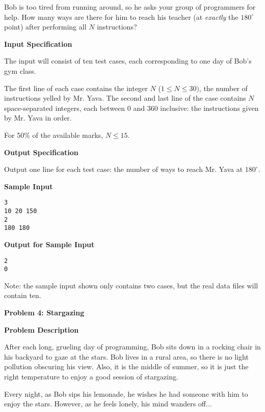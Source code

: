 \documentclass[11pt]{article}
\newcommand{\problem}[2]{\textbf{\Large Problem #1: #2} \vspace{0.4em}}
\newcommand{\heading}[1]{\vspace{0.6em} \textbf{#1}}
\begin{document}
Bob is too tired from running around, so he asks your group of programmers for help. How many ways are there for him to reach his teacher (at \textit{exactly} the $180^{\circ}$ point) after performing all $N$ instructions?


\heading{Input Specification}

The input will consist of ten test cases, each corresponding to one day of Bob's gym class.

The first line of each case contains the integer $N$ ($1 \le N \le 30)$, the number of instructions yelled by Mr. Yava. The second and last line of the case contains $N$ space-separated integers, each between 0 and 360 inclusive: the instructions given by Mr. Yava in order.

For 50\% of the available marks, $N \le 15$.


\heading{Output Specification}

Output one line for each test case: the number of ways to reach Mr. Yava at $180^{\circ}$.


\heading{Sample Input}
\vspace{-\topsep}
\begin{verbatim}
3
10 20 150
2
180 180
\end{verbatim}

\vspace{-\topsep}
\heading{Output for Sample Input}
\vspace{-\topsep}
\begin{verbatim}
2
0
\end{verbatim}

Note: the sample input shown only contains two cases, but the real data files will contain ten.


\pagebreak




\problem{4}{Stargazing}


\heading{Problem Description}

After each long, grueling day of programming, Bob sits down in a rocking chair in his backyard to gaze at the stars. Bob lives in a rural area, so there is no light pollution obscuring his view. Also, it is the middle of summer, so it is just the right temperature to enjoy a good session of stargazing.

Every night, as Bob sips his lemonade, he wishes he had someone with him to enjoy the stars. However, as he feels lonely, his mind wanders off...
\end{document}

